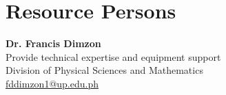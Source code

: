 %
%
%                 

\chapter{Resource Persons}
\label{sec:appendixb}

%
%
%
%

%
%

\newcommand{\resperson}[4]{\textbf{#1} \\ #2 \\ #3 \\ \url{#4}\vspace{0.5em}\\}

\resperson{Dr. Francis Dimzon}{Provide technical expertise and equipment support}{Division of Physical Sciences and Mathematics}{fddimzon1@up.edu.ph}

